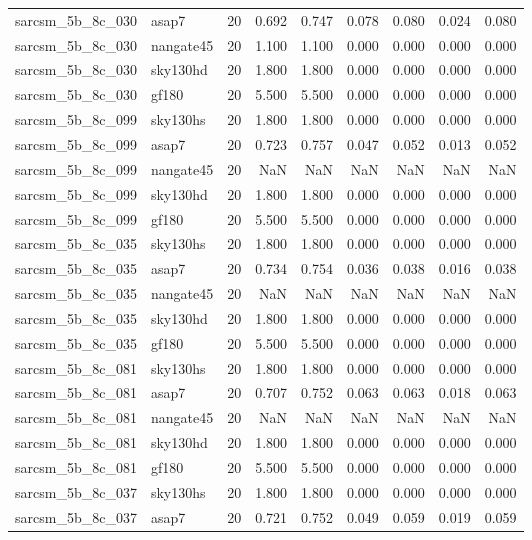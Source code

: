 \begin{tabular}{llrrrrrrr}
sarcsm\_5b\_8c\_030 & asap7 & 20 & 0.692 & 0.747 & 0.078 & 0.080 & 0.024 & 0.080 \\
sarcsm\_5b\_8c\_030 & nangate45 & 20 & 1.100 & 1.100 & 0.000 & 0.000 & 0.000 & 0.000 \\
sarcsm\_5b\_8c\_030 & sky130hd & 20 & 1.800 & 1.800 & 0.000 & 0.000 & 0.000 & 0.000 \\
sarcsm\_5b\_8c\_030 & gf180 & 20 & 5.500 & 5.500 & 0.000 & 0.000 & 0.000 & 0.000 \\
sarcsm\_5b\_8c\_099 & sky130hs & 20 & 1.800 & 1.800 & 0.000 & 0.000 & 0.000 & 0.000 \\
sarcsm\_5b\_8c\_099 & asap7 & 20 & 0.723 & 0.757 & 0.047 & 0.052 & 0.013 & 0.052 \\
sarcsm\_5b\_8c\_099 & nangate45 & 20 & NaN & NaN & NaN & NaN & NaN & NaN \\
sarcsm\_5b\_8c\_099 & sky130hd & 20 & 1.800 & 1.800 & 0.000 & 0.000 & 0.000 & 0.000 \\
sarcsm\_5b\_8c\_099 & gf180 & 20 & 5.500 & 5.500 & 0.000 & 0.000 & 0.000 & 0.000 \\
sarcsm\_5b\_8c\_035 & sky130hs & 20 & 1.800 & 1.800 & 0.000 & 0.000 & 0.000 & 0.000 \\
sarcsm\_5b\_8c\_035 & asap7 & 20 & 0.734 & 0.754 & 0.036 & 0.038 & 0.016 & 0.038 \\
sarcsm\_5b\_8c\_035 & nangate45 & 20 & NaN & NaN & NaN & NaN & NaN & NaN \\
sarcsm\_5b\_8c\_035 & sky130hd & 20 & 1.800 & 1.800 & 0.000 & 0.000 & 0.000 & 0.000 \\
sarcsm\_5b\_8c\_035 & gf180 & 20 & 5.500 & 5.500 & 0.000 & 0.000 & 0.000 & 0.000 \\
sarcsm\_5b\_8c\_081 & sky130hs & 20 & 1.800 & 1.800 & 0.000 & 0.000 & 0.000 & 0.000 \\
sarcsm\_5b\_8c\_081 & asap7 & 20 & 0.707 & 0.752 & 0.063 & 0.063 & 0.018 & 0.063 \\
sarcsm\_5b\_8c\_081 & nangate45 & 20 & NaN & NaN & NaN & NaN & NaN & NaN \\
sarcsm\_5b\_8c\_081 & sky130hd & 20 & 1.800 & 1.800 & 0.000 & 0.000 & 0.000 & 0.000 \\
sarcsm\_5b\_8c\_081 & gf180 & 20 & 5.500 & 5.500 & 0.000 & 0.000 & 0.000 & 0.000 \\
sarcsm\_5b\_8c\_037 & sky130hs & 20 & 1.800 & 1.800 & 0.000 & 0.000 & 0.000 & 0.000 \\
sarcsm\_5b\_8c\_037 & asap7 & 20 & 0.721 & 0.752 & 0.049 & 0.059 & 0.019 & 0.059 \\

\end{tabular}
